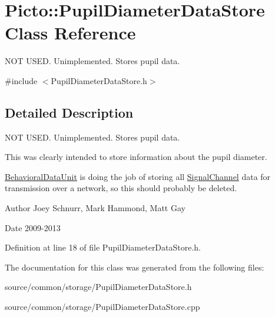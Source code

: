 \hypertarget{class_picto_1_1_pupil_diameter_data_store}{\section{Picto\-:\-:Pupil\-Diameter\-Data\-Store Class Reference}
\label{class_picto_1_1_pupil_diameter_data_store}
}


N\-O\-T U\-S\-E\-D. Unimplemented. Stores pupil data.  




{\ttfamily \#include $<$Pupil\-Diameter\-Data\-Store.\-h$>$}



\subsection{Detailed Description}
N\-O\-T U\-S\-E\-D. Unimplemented. Stores pupil data. 

This was clearly intended to store information about the pupil diameter.

\hyperlink{class_picto_1_1_behavioral_data_unit}{Behavioral\-Data\-Unit} is doing the job of storing all \hyperlink{class_picto_1_1_signal_channel}{Signal\-Channel} data for transmission over a network, so this should probably be deleted.

\begin{DoxyAuthor}{Author}
Joey Schnurr, Mark Hammond, Matt Gay 
\end{DoxyAuthor}
\begin{DoxyDate}{Date}
2009-\/2013 
\end{DoxyDate}


Definition at line 18 of file Pupil\-Diameter\-Data\-Store.\-h.



The documentation for this class was generated from the following files\-:\begin{DoxyCompactItemize}
\item 
source/common/storage/Pupil\-Diameter\-Data\-Store.\-h\item 
source/common/storage/Pupil\-Diameter\-Data\-Store.\-cpp\end{DoxyCompactItemize}
